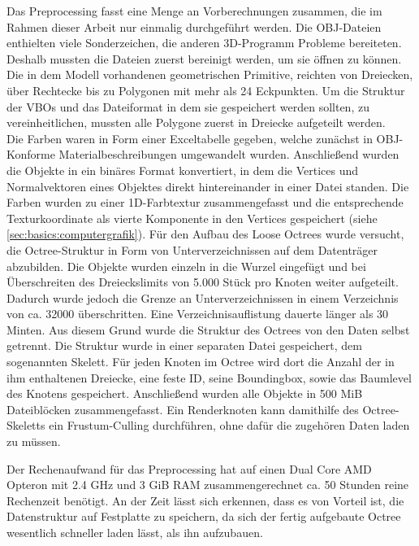 Das Preprocessing fasst eine Menge an Vorberechnungen zusammen, die im Rahmen dieser Arbeit nur einmalig durchgeführt werden. Die OBJ-Dateien enthielten viele Sonderzeichen, die anderen 3D-Programm Probleme bereiteten. Deshalb mussten die Dateien zuerst bereinigt werden, um sie öffnen zu können. Die in dem Modell vorhandenen geometrischen Primitive, reichten von Dreiecken, über Rechtecke bis zu Polygonen mit mehr als 24 Eckpunkten. Um die Struktur der VBOs und das Dateiformat in dem sie gespeichert werden sollten, zu vereinheitlichen, mussten alle Polygone zuerst in Dreiecke aufgeteilt werden. \\
Die Farben waren in Form einer Exceltabelle gegeben, welche zunächst in OBJ-Konforme Materialbeschreibungen umgewandelt wurden. Anschließend wurden die Objekte in ein binäres Format konvertiert, in dem die Vertices und Normalvektoren eines Objektes direkt hintereinander in einer Datei standen. Die Farben wurden zu einer 1D-Farbtextur zusammengefasst und die entsprechende Texturkoordinate als vierte Komponente in den Vertices gespeichert (siehe \ref{sec:basics:computergrafik}). Für den Aufbau des Loose Octrees wurde versucht, die Octree-Struktur in Form von Unterverzeichnissen auf dem Datenträger abzubilden. Die Objekte wurden einzeln in die Wurzel eingefügt und bei Überschreiten des Dreieckslimits von 5.000 Stück pro Knoten weiter aufgeteilt. Dadurch wurde jedoch die Grenze an Unterverzeichnissen in einem Verzeichnis von ca. 32000 überschritten. Eine Verzeichnisauflistung dauerte länger als 30 Minten. Aus diesem Grund wurde die Struktur des Octrees von den Daten selbst getrennt. Die Struktur wurde in einer separaten Datei gespeichert, dem sogenannten Skelett. Für jeden Knoten im Octree wird dort die Anzahl der in ihm enthaltenen Dreiecke, eine feste ID, seine Boundingbox, sowie das Baumlevel des Knotens gespeichert. Anschließend wurden alle Objekte in 500 MiB Dateiblöcken zusammengefasst. Ein Renderknoten kann damithilfe des Octree-Skeletts ein Frustum-Culling durchführen, ohne dafür die zugehören Daten laden zu müssen.

Der Rechenaufwand für das Preprocessing hat auf einen Dual Core AMD Opteron mit 2.4 GHz und 3 GiB RAM zusammengerechnet ca. 50 Stunden reine Rechenzeit benötigt. An der Zeit lässt sich erkennen, dass es von Vorteil ist, die Datenstruktur auf Festplatte zu speichern, da sich der fertig aufgebaute Octree wesentlich schneller laden lässt, als ihn aufzubauen.

